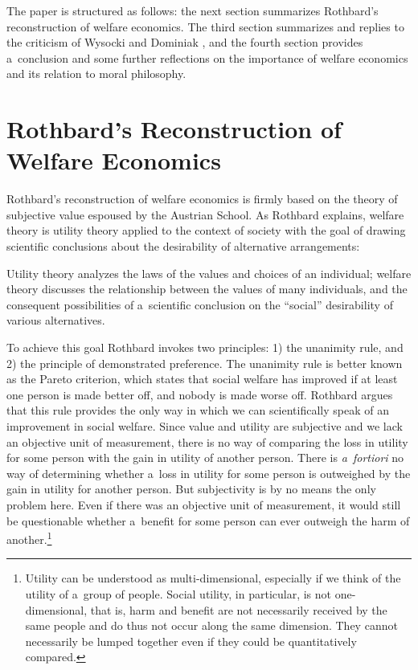 The paper is structured as follows: the next section summarizes Rothbard's reconstruction of welfare economics. The third section summarizes and replies to the criticism of Wysocki and Dominiak 
\parencite*[][]{wysocki_how_2023}, %
 and the fourth section provides a~conclusion and some further reflections on the importance of welfare economics and its relation to moral philosophy.



\section{Rothbard's Reconstruction of Welfare Economics}

Rothbard's reconstruction of welfare economics is firmly based on the theory of subjective value espoused by the Austrian School. As Rothbard explains, welfare theory is utility theory applied to the context of society with the goal of drawing scientific conclusions about the desirability of alternative arrangements:



Utility theory analyzes the laws of the values and choices of an individual; welfare theory discusses the relationship between the values of many individuals, and the consequent possibilities of a~scientific conclusion on the ``social'' desirability of various alternatives. 
\parencite[][p.289]{rothbard_toward_2011}%




To achieve this goal Rothbard invokes two principles: 1) the unanimity rule, and 2) the principle of demonstrated preference. The unanimity rule is better known as the Pareto criterion, which states that social welfare has improved if at least one person is made better off, and nobody is made worse off. Rothbard argues that this rule provides the only way in which we can scientifically speak of an improvement in social welfare. Since value and utility are subjective and we lack an objective unit of measurement, there is no way of comparing the loss in utility for some person with the gain in utility of another person. There is \textit{a~fortiori} no way of determining whether a~loss in utility for some person is outweighed by the gain in utility for another person. But subjectivity is by no means the only problem here. Even if there was an objective unit of measurement, it would still be questionable whether a~benefit for some person can ever outweigh the harm of another.\footnote{Utility can be understood as multi-dimensional, especially if we think of the utility of a~group of people. Social utility, in particular, is not one-dimensional, that is, harm and benefit are not necessarily received by the same people and do thus not occur along the same dimension. They cannot necessarily be lumped together even if they could be quantitatively compared. }



